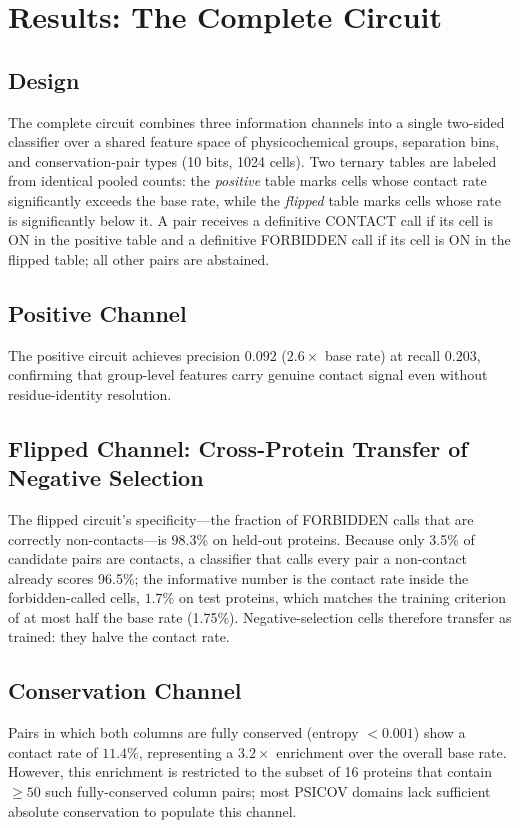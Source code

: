\section{Results: The Complete Circuit}
\label{sec:results-complete-circuit}

\subsection{Design}
The complete circuit combines three information channels into a single
two-sided classifier over a shared feature space of physicochemical groups,
separation bins, and conservation-pair types (10 bits, 1024 cells).  Two
ternary tables are labeled from identical pooled counts: the \emph{positive}
table marks cells whose contact rate significantly exceeds the base rate, while
the \emph{flipped} table marks cells whose rate is significantly below it.
A pair receives a definitive CONTACT call if its cell is ON in the positive
table and a definitive FORBIDDEN call if its cell is ON in the flipped table;
all other pairs are abstained.

\subsection{Positive Channel}
The positive circuit achieves precision $0.092$ ($2.6\times$ base rate) at
recall $0.203$, confirming that group-level features carry genuine contact
signal even without residue-identity resolution.

\subsection{Flipped Channel: Cross-Protein Transfer of Negative Selection}
The flipped circuit's specificity---the fraction of FORBIDDEN calls that are
correctly non-contacts---is 98.3\% on held-out proteins.  Because only 3.5\% of
candidate pairs are contacts, a classifier that calls every pair a non-contact
already scores 96.5\%; the informative number is the contact rate inside the
forbidden-called cells, $1.7\%$ on test proteins, which matches the training
criterion of at most half the base rate (1.75\%).  Negative-selection cells
therefore transfer as trained: they halve the contact rate.

\subsection{Conservation Channel}
Pairs in which both columns are fully conserved (entropy $< 0.001$) show a
contact rate of $11.4\%$, representing a $3.2\times$ enrichment over the
overall base rate.  However, this enrichment is restricted to the subset of
16 proteins that contain $\geq 50$ such fully-conserved column pairs; most
PSICOV domains lack sufficient absolute conservation to populate this channel.

